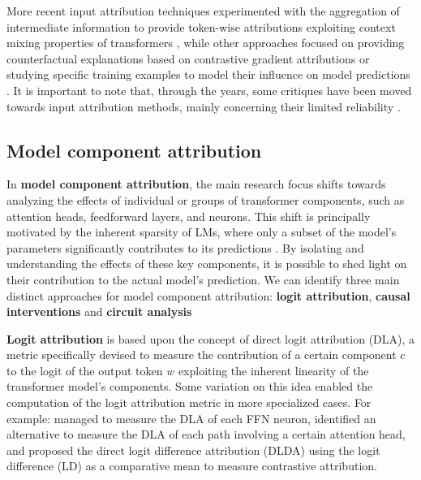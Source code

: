 More recent input attribution techniques experimented with the aggregation of intermediate information to provide token-wise attributions exploiting context mixing properties of transformers \cite{ferrando2022, modarressi2022, mohebbi2023}, while other approaches focused on providing counterfactual explanations based on contrastive gradient attributions \cite{yin2022} or studying specific training examples to model their influence on model predictions \cite{kwon2024, grosse2023}.
It is important to note that, through the years, some critiques have been moved towards input attribution methods, mainly concerning their limited reliability \cite{sixt2019, adebayo2018, atanasova2020}.

\subsection{Model component attribution}

In \textbf{model component attribution}, the main research focus shifts towards analyzing the effects of individual or groups of transformer components, such as attention heads, feedforward layers, and neurons.
This shift is principally motivated by the inherent sparsity of LMs, where only a subset of the model's parameters significantly contributes to its predictions .
By isolating and understanding the effects of these key components, it is possible to shed light on their contribution to the actual model's prediction.
We can identify three main distinct approaches for model component attribution: \textbf{logit attribution}, \textbf{causal interventions} and \textbf{circuit analysis}

\textbf{Logit attribution} is based upon the concept of direct logit attribution (DLA), a metric specifically devised to measure the contribution of a certain component $c$ to the logit of the output token $w$ exploiting the inherent linearity of the transformer model's components.
Some variation on this idea enabled the computation of the logit attribution metric in more specialized cases.
For example: \citet{geva2022} managed to measure the DLA of each FFN neuron, \citet{ferrando2023} identified an alternative to measure the DLA of each path involving a certain attention head, and \citet{wang2023} proposed the direct logit difference attribution (DLDA) using the logit difference (LD) as a comparative mean to measure contrastive attribution.

